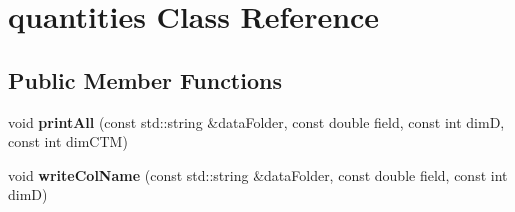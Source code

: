 \hypertarget{classquantities}{}\section{quantities Class Reference}
\label{classquantities}
\subsection*{Public Member Functions}
\begin{DoxyCompactItemize}
\item 
void {\bfseries print\+All} (const std\+::string \&data\+Folder, const double field, const int dimD, const int dim\+C\+TM)\hypertarget{classquantities_a4832f2098de5483aefad10950460bf54}{}\label{classquantities_a4832f2098de5483aefad10950460bf54}

\item 
void {\bfseries write\+Col\+Name} (const std\+::string \&data\+Folder, const double field, const int dimD)\hypertarget{classquantities_ae07ba6a8b1c9be67c9154f04fa1d6f2b}{}\label{classquantities_ae07ba6a8b1c9be67c9154f04fa1d6f2b}

\end{DoxyCompactItemize}
